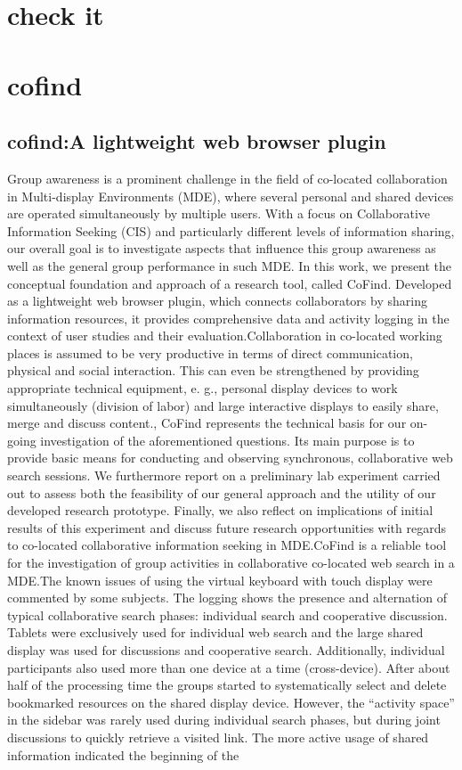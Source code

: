\section{check it}

\section{cofind}
\subsection{cofind:A lightweight web browser plugin}

Group awareness is a prominent challenge in the field of co-located collaboration in Multi-display Environments (MDE), where several personal and shared devices are operated simultaneously by multiple users. With a focus on Collaborative Information Seeking (CIS) and particularly different levels of information sharing, our overall goal is to investigate aspects that influence this group awareness as well as the general group performance in such MDE. In this work, we present the conceptual foundation and approach of a research tool, called CoFind. Developed as a lightweight web browser plugin, which connects collaborators by sharing information resources, it provides comprehensive data and activity logging in the context of user studies and their evaluation.Collaboration in co-located working places is assumed to be very productive in terms of direct communication, physical and social interaction. This can even be strengthened by providing appropriate technical equipment, e. g., personal display devices to work simultaneously (division of labor) and large interactive displays to easily share, merge and discuss content., CoFind represents the technical basis for our on-going investigation of the aforementioned questions. Its main purpose is to provide basic means for conducting and observing synchronous, collaborative web search sessions. We furthermore report on a preliminary lab experiment carried out to assess both the feasibility of our general approach and the utility of our developed research prototype. Finally, we also reflect on implications of initial results of this experiment and discuss future research opportunities with regards to co-located collaborative information seeking in MDE.CoFind is a reliable tool for the investigation of group activities in collaborative co-located web search in a MDE.The known issues of using the virtual keyboard with touch display were commented by some subjects. The logging shows the presence and alternation of typical collaborative search phases: individual search and cooperative discussion. Tablets were exclusively used for individual web search and the large shared display was used for discussions and cooperative search. Additionally, individual participants also used more than one device at a time (cross-device). After about half of the processing time the groups started to systematically select and delete bookmarked resources on the shared display device. However, the “activity space” in the sidebar was rarely used during individual search phases, but during joint discussions to quickly retrieve a visited link. The more active usage of shared information indicated the beginning of the 